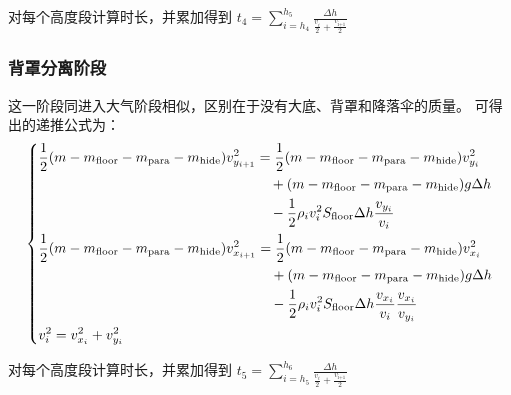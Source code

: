 \documentclass[hyperref,a4paper,UTF8]{ctexart}
\begin{document}
对每个高度段计算时长，并累加得到
$
    \displaystyle t_4=\sum_{i=h_4}^{h_5}{\displaystyle\frac{\Delta h}{\frac{\displaystyle v_i}
        {\displaystyle 2}+\frac{\displaystyle v_{\textrm{i+1}} }{\displaystyle 2}}}
$

\subsubsection{背罩分离阶段}
这一阶段同进入大气阶段相似，区别在于没有大底、背罩和降落伞的质量。
可得出的递推公式为：
\[
    \begin{dcases}
        \begin{split}
            \frac{1}{2}(m-m_{\text{floor}}-m_{\text{para}}-m_{\text{hide}})v_{y_{i + 1}}^2 &=
            \frac{1}{2}(m-m_{\text{floor}}-m_{\text{para}}-m_{\text{hide}})
            v_{y_{i}}^2 \\ &\quad + (m-m_{\text{floor}}-m_{\text{para}}-m_{\text{hide}})
            g\Delta h\\ &\quad -\frac{1}{2}\rho _iv_i^2
            S_{\text{floor}}\Delta h\frac{v_{y_i}}{v_i}
        \end{split}
        \\
        \begin{split}
            \frac{1}{2}(m-m_{\text{floor}}-m_{\text{para}}-m_{\text{hide}})v_{x_{i + 1}}^2 &=
            \frac{1}{2}(m-m_{\text{floor}}-m_{\text{para}}-m_{\text{hide}})
            v_{x_{i}}^2 \\ &\quad + (m-m_{\text{floor}}-m_{\text{para}}-m_{\text{hide}})
            g\Delta h \\ &\quad -\frac{1}{2}\rho _iv_i^2S_{\text{floor}}\Delta h
            \frac{v_{x_i}}{v_i}\frac{v_{x_i}}{v_{y_i}}
        \end{split}
        \\
        v_i^2 = v_{x_i}^2 + v_{y_i}^2
    \end{dcases}
\]

对每个高度段计算时长，并累加得到
$
    \displaystyle t_5=\sum_{i=h_5}^{h_6}{\displaystyle\frac{\Delta h}{\frac{\displaystyle v_i}
        {\displaystyle 2}+\frac{\displaystyle v_{\textrm{i+1}} }{\displaystyle 2}}}
$
\end{document}
